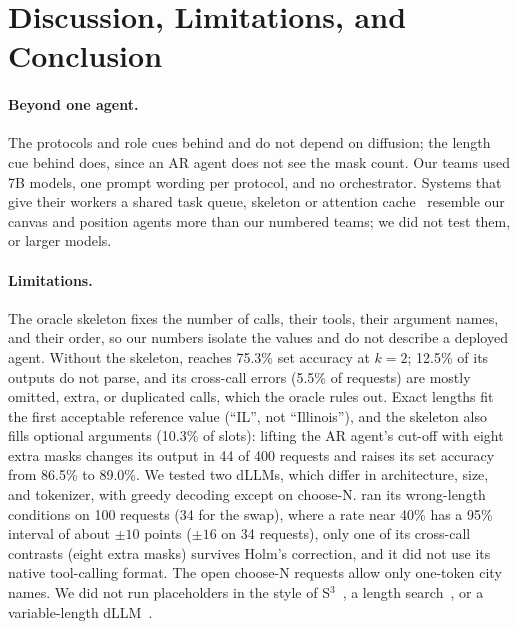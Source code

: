 \section{Discussion, Limitations, and Conclusion}
\label{sec:discussion}

\paragraph{Beyond one agent.} The protocols and role cues behind  and  do not depend on diffusion; the length cue behind  does, since an AR agent does not see the mask count. Our teams used 7B models, one prompt wording per protocol, and no orchestrator. Systems that give their workers a shared task queue, skeleton or attention cache~\cite{mao2026delm,ning2024skeleton,rodionov2025hogwild} resemble our canvas and position agents more than our numbered teams; we did not test them, or larger models.

\paragraph{Limitations.} The oracle skeleton fixes the number of calls, their tools, their argument names, and their order, so our numbers isolate the values and do not describe a deployed agent. Without the skeleton, \dream reaches 75.3\% set accuracy at $k=2$; 12.5\% of its outputs do not parse, and its cross-call errors (5.5\% of requests) are mostly omitted, extra, or duplicated calls, which the oracle rules out. Exact lengths fit the first acceptable reference value (``IL'', not ``Illinois''), and the skeleton also fills optional arguments (10.3\% of slots): lifting the AR agent's cut-off with eight extra masks changes its output in 44 of 400 requests and raises its set accuracy from 86.5\% to 89.0\%. We tested two dLLMs, which differ in architecture, size, and tokenizer, with greedy decoding except on choose-N. \llada ran its wrong-length conditions on 100 requests (34 for the swap), where a rate near 40\% has a 95\% interval of about $\pm 10$ points ($\pm 16$ on 34 requests), only one of its cross-call contrasts (eight extra masks) survives Holm's correction, and it did not use its native tool-calling format. The open choose-N requests allow only one-token city names. We did not run placeholders in the style of S$^3$~\cite{xiong2026s3}, a length search~\cite{liu2026cal}, or a variable-length dLLM~\cite{wu2026dreamon}.

